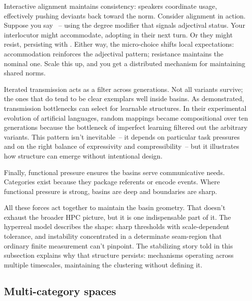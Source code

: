 Interactive alignment maintains consistency: speakers coordinate usage, effectively pushing deviants back toward the norm. Consider alignment in action. Suppose you say ~-- using the degree modifier that signals adjectival status. Your interlocutor might accommodate, adopting  in their next turn. Or they might resist, persisting with . Either way, the micro-choice shifts local expectations: accommodation reinforces the adjectival pattern; resistance maintains the nominal one. Scale this up, and you get a distributed mechanism for maintaining shared norms.

Iterated transmission acts as a filter across generations. Not all variants survive; the ones that do tend to be clear exemplars well inside basins. As \textcite{kirby2008} demonstrated, transmission bottlenecks can select for learnable structures. In their experimental evolution of artificial languages, random mappings became compositional over ten generations because the bottleneck of imperfect learning filtered out the arbitrary variants. This pattern isn't inevitable~-- it depends on particular task pressures and on the right balance of expressivity and compressibility~-- but it illustrates how structure can emerge without intentional design.

Finally, functional pressure ensures the basins serve communicative needs. Categories exist because they package referents or encode events. Where functional pressure is strong, basins are deep and boundaries are sharp.

All these forces act together to maintain the basin geometry. That doesn't exhaust the broader HPC picture, but it is one indispensable part of it. The hyperreal model describes the shape: sharp thresholds with scale-dependent tolerance, and instability concentrated in a determinate seam-region that ordinary finite measurement can't pinpoint. The stabilizing story told in this subsection explains why that structure persists: mechanisms operating across multiple timescales, maintaining the clustering without defining it.

\subsection{Multi-category spaces}
\label{subsec:5:multi-category}

